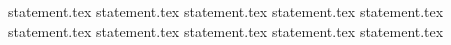 {statement.tex}
{statement.tex}
{statement.tex}
{statement.tex}
{statement.tex}
{statement.tex}
{statement.tex}
{statement.tex}
{statement.tex}
{statement.tex}